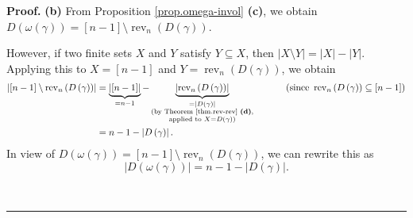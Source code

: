 \documentclass[numbers=enddot,12pt,final,onecolumn,notitlepage]{scrartcl}%
\theoremstyle{definition}
\newenvironment{proof}[1][Proof]{\noindent\textbf{#1.} }{\ \rule{0.5em}{0.5em}}
\begin{document}
\begin{proof}
\textbf{(b)} From Proposition \ref{prop.omega-invol} \textbf{(c)}, we obtain
$D\left(  \omega\left(  \gamma\right)  \right)  =\left[  n-1\right]
\setminus\operatorname*{rev}\nolimits_{n}\left(  D\left(  \gamma\right)
\right)  $.

However, if two finite sets $X$ and $Y$ satisfy $Y\subseteq X$, then
$\left\vert X\setminus Y\right\vert =\left\vert X\right\vert -\left\vert
Y\right\vert $. Applying this to $X=\left[  n-1\right]  $ and
$Y=\operatorname*{rev}\nolimits_{n}\left(  D\left(  \gamma\right)  \right)  $,
we obtain
\begin{align*}
\left\vert \left[  n-1\right]  \setminus\operatorname*{rev}\nolimits_{n}%
\left(  D\left(  \gamma\right)  \right)  \right\vert  &
=\underbrace{\left\vert \left[  n-1\right]  \right\vert }_{\substack{=n-1}%
}-\underbrace{\left\vert \operatorname*{rev}\nolimits_{n}\left(  D\left(
\gamma\right)  \right)  \right\vert }_{\substack{=\left\vert D\left(
\gamma\right)  \right\vert \\\text{(by Theorem \ref{thm.rev-rev}
\textbf{(d)},}\\\text{applied to }X=D\left(  \gamma\right)  \text{)}%
}}\ \ \ \ \ \ \ \ \ \ \left(  \text{since }\operatorname*{rev}\nolimits_{n}%
\left(  D\left(  \gamma\right)  \right)  \subseteq\left[  n-1\right]  \right)
\\
&  =n-1-\left\vert D\left(  \gamma\right)  \right\vert .
\end{align*}
In view of $D\left(  \omega\left(  \gamma\right)  \right)  =\left[
n-1\right]  \setminus\operatorname*{rev}\nolimits_{n}\left(  D\left(
\gamma\right)  \right)  $, we can rewrite this as%
\begin{equation}
\left\vert D\left(  \omega\left(  \gamma\right)  \right)  \right\vert
=n-1-\left\vert D\left(  \gamma\right)  \right\vert .
\label{pf.prop.eta.S.O1.Dwgsize}%
\end{equation}



\end{proof}
\end{document}
